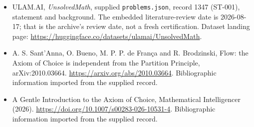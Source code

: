 \documentclass[11pt,a4paper]{article}
\begin{document}
{\small

\begin{itemize}

\item[\hypertarget{source:1347:1}{S1}] ULAM.AI, \emph{UnsolvedMath}, supplied \texttt{problems.json}, record 1347 (ST-001), statement and background. The embedded literature-review date is 2026-08-17; that is the archive’s review date, not a fresh certification. Dataset landing page: \url{https://huggingface.co/datasets/ulamai/UnsolvedMath}.

\item[\hypertarget{source:1347:2}{S2}] A. S. Sant'Anna, O. Bueno, M. P. P. de França and R. Brodzinski, Flow: the Axiom of Choice is independent from the Partition Principle, arXiv:2010.03664. \url{https://arxiv.org/abs/2010.03664}. Bibliographic information imported from the supplied record.

\item[\hypertarget{source:1347:3}{S3}] A Gentle Introduction to the Axiom of Choice, Mathematical Intelligencer (2026). \url{https://doi.org/10.1007/s00283-026-10531-4}. Bibliographic information imported from the supplied record.

\end{itemize}

}

\label{end:1347}
\end{document}
